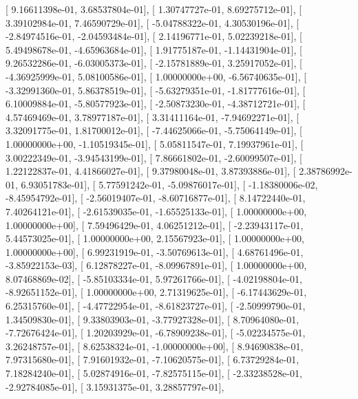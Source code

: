 \documentclass{article}
\begin{document}
       [  9.16611398e-01,   3.68537804e-01],
       [  1.30747727e-01,   8.69275712e-01],
       [  3.39102984e-01,   7.46590729e-01],
       [ -5.04788322e-01,   4.30530196e-01],
       [ -2.84974516e-01,  -2.04593484e-01],
       [  2.14196771e-01,   5.02239218e-01],
       [  5.49498678e-01,  -4.65963684e-01],
       [  1.91775187e-01,  -1.14431904e-01],
       [  9.26532286e-01,  -6.03005373e-01],
       [ -2.15781889e-01,   3.25917052e-01],
       [ -4.36925999e-01,   5.08100586e-01],
       [  1.00000000e+00,  -6.56740635e-01],
       [ -3.32991360e-01,   5.86378519e-01],
       [ -5.63279351e-01,  -1.81777616e-01],
       [  6.10009884e-01,  -5.80577923e-01],
       [ -2.50873230e-01,  -4.38712721e-01],
       [  4.57469469e-01,   3.78977187e-01],
       [  3.31411164e-01,  -7.94692271e-01],
       [  3.32091775e-01,   1.81700012e-01],
       [ -7.44625066e-01,  -5.75064149e-01],
       [  1.00000000e+00,  -1.10519345e-01],
       [  5.05811547e-01,   7.19937961e-01],
       [  3.00222349e-01,  -3.94543199e-01],
       [  7.86661802e-01,  -2.60099507e-01],
       [  1.22122837e-01,   4.41866027e-01],
       [  9.37980048e-01,   3.87393886e-01],
       [  2.38786992e-01,   6.93051783e-01],
       [  5.77591242e-01,  -5.09876017e-01],
       [ -1.18380006e-02,  -8.45954792e-01],
       [ -2.56019407e-01,  -8.60716877e-01],
       [  8.14722440e-01,   7.40264121e-01],
       [ -2.61539035e-01,  -1.65525133e-01],
       [  1.00000000e+00,   1.00000000e+00],
       [  7.59496429e-01,   4.06251212e-01],
       [ -2.23943117e-01,   5.44573025e-01],
       [  1.00000000e+00,   2.15567923e-01],
       [  1.00000000e+00,   1.00000000e+00],
       [  6.99231919e-01,  -3.50769613e-01],
       [  4.68761496e-01,  -3.85922153e-03],
       [  6.12878227e-01,  -8.09967891e-01],
       [  1.00000000e+00,   8.07468869e-02],
       [ -5.85103334e-01,   5.97261766e-01],
       [ -4.02198804e-01,  -8.92651152e-01],
       [  1.00000000e+00,   2.71319625e-01],
       [ -6.17443629e-01,   6.25315760e-01],
       [ -4.47722954e-01,  -8.61823727e-01],
       [ -2.50999790e-01,   1.34509830e-01],
       [  9.33803903e-01,  -3.77927328e-01],
       [  8.70964080e-01,  -7.72676424e-01],
       [  1.20203929e-01,  -6.78909238e-01],
       [ -5.02234575e-01,   3.26248757e-01],
       [  8.62538324e-01,  -1.00000000e+00],
       [  8.94690838e-01,   7.97315680e-01],
       [  7.91601932e-01,  -7.10620575e-01],
       [  6.73729284e-01,   7.18284240e-01],
       [  5.02874916e-01,  -7.82575115e-01],
       [ -2.33238528e-01,  -2.92784085e-01],
       [  3.15931375e-01,   3.28857797e-01],
\end{document}
